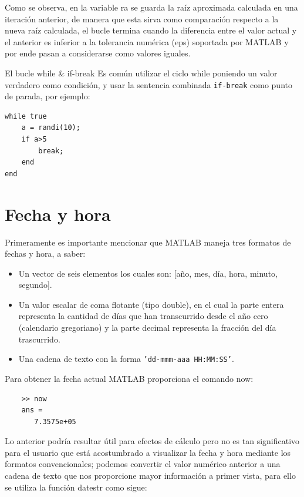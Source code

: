 Como se observa, en la variable ra se guarda la raíz aproximada calculada en una 
iteración anterior, de manera que esta sirva como comparación respecto a la nueva 
raíz calculada, el bucle termina cuando la diferencia entre el valor actual y el 
anterior es inferior a la tolerancia numérica (eps) soportada por MATLAB y por 
ende pasan a considerarse como valores iguales.

\begin{informacion}{El bucle while \& if-break}
Es común utilizar el ciclo while poniendo un valor verdadero como condición, y 
usar la sentencia combinada \texttt{if-break} como punto de parada, por ejemplo:

\begin{verbatim}
while true
    a = randi(10);
    if a>5
        break;
    end
end
\end{verbatim}

\end{informacion}


\section{Fecha y hora}

Primeramente es importante mencionar que MATLAB maneja tres formatos de fechas 
y hora, a saber:

\begin{itemize}
\item Un vector de seis elementos los cuales son: [año, mes, día, hora, minuto, segundo].
\item Un valor escalar de coma flotante (tipo double), en el cual la parte entera representa la cantidad de días que han transcurrido desde el año cero (calendario gregoriano) y la parte decimal representa la fracción del día trascurrido.
\item Una cadena de texto con la forma \texttt{'dd-mmm-aaa HH:MM:SS'}.
\end{itemize}

Para obtener la fecha actual MATLAB proporciona el comando now:

\begin{verbatim}
	>> now
	ans =
	   7.3575e+05
\end{verbatim}

Lo anterior podría resultar útil para efectos de cálculo pero no es tan significativo 
para el usuario que está acostumbrado a visualizar la fecha y hora mediante los formatos 
convencionales; podemos convertir el valor numérico anterior a una cadena de texto que 
nos proporcione mayor información a primer vista, para ello se utiliza la función 
datestr como sigue:

